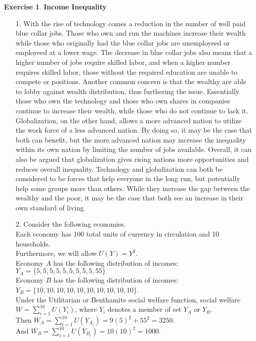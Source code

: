 \documentclass[12pt]{article}
\theoremstyle{definition}
\newtheorem{exercise}[theorem]{Exercise}
\newcommand{\V}{\vspace{0.3cm}\\}
\begin{document}
\newpage
\begin{exercise} \textbf{Income Inequality}
\begin{enumerate}
    \item [1.] With the rise of technology comes a reduction in the number of well paid blue collar jobs.  Those who own and run the machines increase their wealth while those who originally had the blue collar jobs are unemployeed or employeed at a lower wage.  The decrease in blue collar jobs also means that a higher number of jobs require skilled labor, and when a higher number requires skilled labor, those without the required education are unable to compete or positions.  Another common concern is that the wealthy are able to lobby against wealth distribution, thus furthering the issue.  Essentially those who own the technology and those who own shares in companies continue to increase their wealth, while those who do not continue to lack it.  Globalization, on the other hand, allows a more advanced nation to utilize the work force of a less advanced nation.  By doing so, it may be the case that both can benefit, but the more advanced nation may increase the inequality within its own nation by limiting the number of jobs available.  Overall, it can also be argued that globalization gives rising nations more opportunities and reduces overall inequality.  Technology and globalization can both be considered to be forces that help everyone in the long run, but potentially help some groups more than others.  While they increase the gap between the wealthy and the poor, it may be the case that both see an increase in their own standard of living.
    \item [2.] Consider the following economies.\\ Each economy has 100 total units of currency in circulation and 10 households.\\ Furthermore, we will allow $U(Y) = Y^2$.\\
    Economy $A$ has the following distribution of incomes: $Y_A = \{5,5,5,5,5,5,5,5,5,55 \}$ \\
    Economy $B$ has the following distribution of incomes: $Y_B = \{10,10,10,10,10,10,10,10,10,10\}$.\V    Under the Utilitarian or Benthamite social welfare function, social welfare $W = \displaystyle \sum_{i=1}^{10} U(Y_i)$, where $Y_i$ denotes a member of set $Y_A$ or $Y_B$.\\
    Then $W_A = \displaystyle \sum_{i=1}^{10} U(Y_{A_i}) = 9(5)^2+55^2 = 3250$. \\
    And $W_B = \displaystyle \sum_{i=1}^{10} U(Y_{B_i}) = 10(10)^2= 1000$.\\

\end{enumerate}
\end{exercise}
\end{document}
